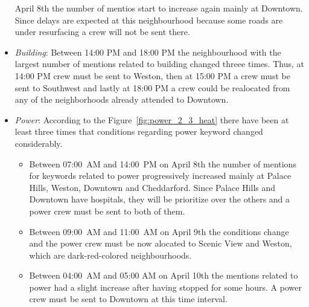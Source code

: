 \begin{itemize}
April 8th the number of mentios start to increase again mainly at Downtown.
Since delays are expected at this neighbourhood because some roads are under
resurfacing a crew  will not be sent there. 
\item \emph{Building}: Between 14:00 PM and 18:00 PM the neighbourhood with the
largest number of mentions related to building changed threee times. Thus, at
14:00 PM crew must be sent to Weston, then at 15:00 PM a crew must be sent to
Southwest and lastly at 18:00 PM a crew could be realocated from any of the
neighborhoods already attended to Downtown.  
\item \emph{Power}: According to the Figure~\ref{fig:power_2_3_heat} there have
been at least three times that conditions regarding power keyword changed considerably.
\begin{itemize}                                                              
          \item Between 07:00~AM and 14:00~PM on April 8th the number of
mentions for keywords related to power progressively increased mainly at Palace Hills, Weston,
Downtown and Cheddarford. Since Palace Hills and Downtown have hospitals, they
will be prioritize over the others and a power crew must be sent to both of them.                                                                  
          \item Between 09:00~AM and 11:00~AM on April 9th the conditions
change and the power crew must be now alocated to Scenic View and Weston, which
are dark-red-colored neighbourhoods.
\item Between 04:00~AM and 05:00 AM on April 10th the mentions related to power
had a slight increase after having stopped for some hours. A power crew must be
sent to Downtown at this time interval.
      \end{itemize}
\end{itemize}          
 
